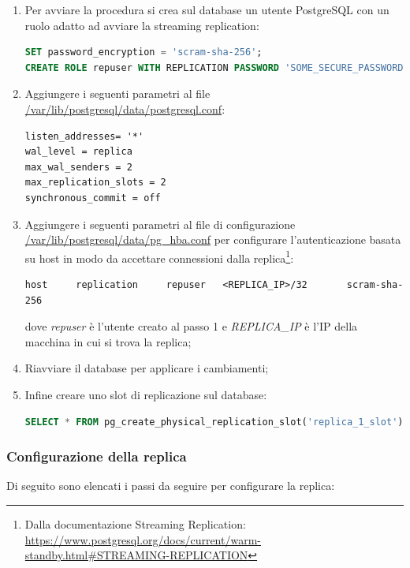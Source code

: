 \begin{enumerate}
  \item Per avviare la procedura si crea sul database un utente PostgreSQL con un ruolo adatto ad avviare la streaming replication:
  \vspace{1mm}
   \begin{lstlisting}[language=sql]
SET password_encryption = 'scram-sha-256'; 
CREATE ROLE repuser WITH REPLICATION PASSWORD 'SOME_SECURE_PASSWORD' LOGIN;\end{lstlisting}
  \item Aggiungere i seguenti parametri al file \url{/var/lib/postgresql/data/postgresql.conf}:
  \vspace{1mm}
  \begin{lstlisting}[]
listen_addresses= '*'
wal_level = replica
max_wal_senders = 2
max_replication_slots = 2
synchronous_commit = off
\end{lstlisting}

  \item Aggiungere i seguenti parametri al file di configurazione \url{/var/lib/postgresql/data/pg_hba.conf} per configurare l'autenticazione basata su host in modo da accettare connessioni dalla replica\footnote{Dalla documentazione Streaming Replication: \url{https://www.postgresql.org/docs/current/warm-standby.html\#STREAMING-REPLICATION}}:
  \vspace{1mm}
\begin{lstlisting}[]
host     replication     repuser   <REPLICA_IP>/32       scram-sha-256
\end{lstlisting}
dove \textit{repuser} è l'utente creato al passo 1 e \textit{REPLICA\_IP} è l'IP della macchina in cui si trova la replica;
  \item Riavviare il database per applicare i cambiamenti;
  \item Infine creare uno slot di replicazione sul database:
  \vspace{1mm}
  \begin{lstlisting}[language=sql]
SELECT * FROM pg_create_physical_replication_slot('replica_1_slot');
\end{lstlisting}
\end{enumerate}

\subsubsection{Configurazione della replica}
Di seguito sono elencati i passi da seguire per configurare la replica:

